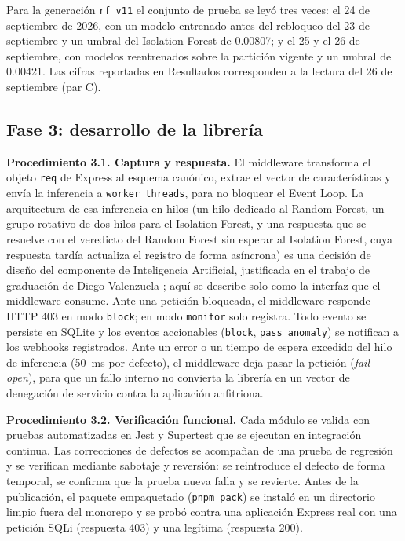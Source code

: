 Para la generación \texttt{rf\_v11} el conjunto de prueba se leyó tres veces: el 24 de septiembre
de 2026, con un modelo entrenado antes del rebloqueo del 23 de septiembre y un umbral del
Isolation Forest de 0.00807; y el 25 y el 26 de septiembre, con modelos reentrenados sobre la
partición vigente y un umbral de 0.00421. Las cifras reportadas en Resultados corresponden a la
lectura del 26 de septiembre (par C).

\subsection{Fase 3: desarrollo de la librería}
\label{subsec:met-f3}

\textbf{Procedimiento 3.1. Captura y respuesta.} El middleware transforma el objeto
\texttt{req} de Express al esquema canónico, extrae el vector de características y envía la
inferencia a \texttt{worker\_threads}, para no bloquear el Event Loop. La arquitectura de esa
inferencia en hilos (un hilo dedicado al Random Forest, un grupo rotativo de dos hilos para el
Isolation Forest, y una respuesta que se resuelve con el veredicto del Random Forest sin esperar
al Isolation Forest, cuya respuesta tardía actualiza el registro de forma asíncrona) es una
decisión de diseño del componente de Inteligencia Artificial, justificada en el trabajo de
graduación de Diego Valenzuela \cite{valenzuela2026ia}; aquí se describe solo como la interfaz que el middleware consume.
Ante una petición bloqueada, el middleware responde HTTP 403 en
modo \texttt{block}; en modo \texttt{monitor} solo registra. Todo evento se persiste en SQLite y
los eventos accionables (\texttt{block}, \texttt{pass\_anomaly}) se notifican a los webhooks
registrados. Ante un error o un tiempo de espera excedido del hilo de inferencia (50~ms por
defecto), el middleware deja pasar la petición (\textit{fail-open}), para que un fallo interno
no convierta la librería en un vector de denegación de servicio contra la aplicación anfitriona.

\textbf{Procedimiento 3.2. Verificación funcional.} Cada módulo se valida con pruebas
automatizadas en Jest \cite{jestdocs} y Supertest \cite{supertestdocs} que se ejecutan en
integración continua. Las correcciones de defectos se acompañan de una prueba de regresión y se
verifican mediante sabotaje y reversión: se reintroduce el defecto de forma temporal, se
confirma que la prueba nueva falla y se revierte. Antes de la publicación, el paquete empaquetado
(\texttt{pnpm pack}) se instaló en un directorio limpio fuera del monorepo y se probó contra una
aplicación Express real con una petición SQLi (respuesta 403) y una legítima (respuesta 200).

